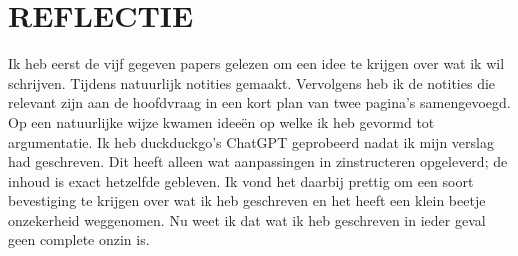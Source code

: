 \documentclass[a4paper,11pt]{article}
\begin{document}
\printbibliography

\section*{REFLECTIE}
Ik heb eerst de vijf gegeven papers gelezen om een idee te krijgen over wat ik wil schrijven. Tijdens natuurlijk
notities gemaakt. Vervolgens heb ik de notities die relevant zijn aan de hoofdvraag in een kort plan van twee
pagina’s
samengevoegd. Op een natuurlijke wijze kwamen ideeën op welke ik heb gevormd tot argumentatie. Ik heb
duckduckgo’s
ChatGPT geprobeerd nadat ik mijn verslag had geschreven. Dit heeft alleen wat aanpassingen in zinstructeren
opgeleverd; de inhoud is exact hetzelfde gebleven. Ik vond het daarbij prettig om een soort bevestiging te krijgen
over
wat ik heb geschreven en het heeft een klein beetje onzekerheid weggenomen. Nu weet ik dat wat ik heb geschreven
in
ieder geval geen complete onzin is.
\end{document}
